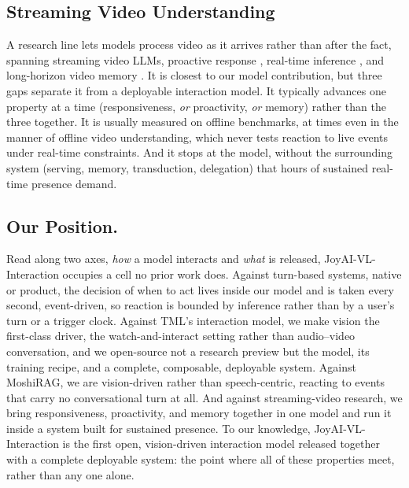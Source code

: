 \documentclass{llmxive}
\begin{document}
\subsection{Streaming Video Understanding}
A research line lets models process video as it arrives rather than after the fact, spanning streaming video LLMs, proactive response \cite{xia2025streamingvideoinstructiontuning,qian2025dispider,yan2026proactvl}, real-time inference \cite{xu2025streamingvlmrealtimeunderstandinginfinite,wang2026acceleratingstreamingvideolarge}, and long-horizon video memory \cite{yao2025timechatonline,zhang2026hermeskvcachehierarchical,zeng2026streamforest}. It is closest to our model contribution, but three gaps separate it from a deployable interaction model. It typically advances one property at a time (responsiveness, \textit{or} proactivity, \textit{or} memory) rather than the three together. It is usually measured on offline benchmarks, at times even in the manner of offline video understanding, which never tests reaction to live events under real-time constraints. And it stops at the model, without the surrounding system (serving, memory, transduction, delegation) that hours of sustained real-time presence demand. 

\subsection{Our Position.} Read along two axes, \textit{how} a model interacts and \textit{what} is released, JoyAI-VL-Interaction occupies a cell no prior work does. Against turn-based systems, native or product, the decision of when to act lives inside our model and is taken every second, event-driven, so reaction is bounded by inference rather than by a user's turn or a trigger clock. Against TML's interaction model, we make vision the first-class driver, the watch-and-interact setting rather than audio--video conversation, and we open-source not a research preview but the model, its training recipe, and a complete, composable, deployable system. Against MoshiRAG, we are vision-driven rather than speech-centric, reacting to events that carry no conversational turn at all. And against streaming-video research, we bring responsiveness, proactivity, and memory together in one model and run it inside a system built for sustained presence. To our knowledge, JoyAI-VL-Interaction is the first open, vision-driven interaction model released together with a complete deployable system: the point where all of these properties meet, rather than any one alone.
\end{document}
